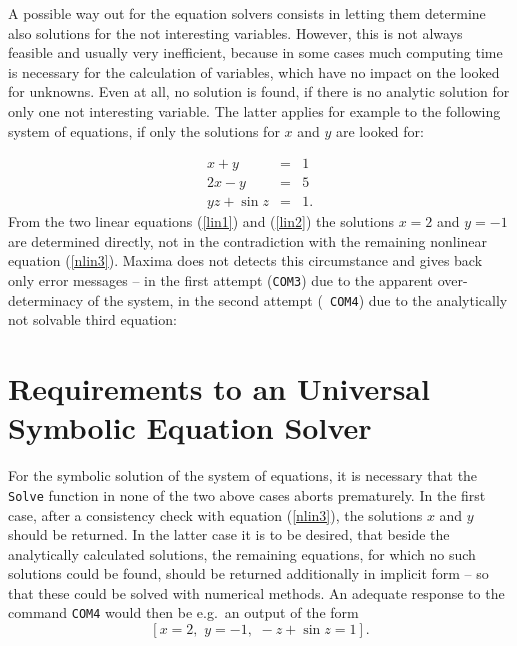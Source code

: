 A possible way out for the equation solvers consists in letting them determine also solutions for the not interesting variables. However, this is not always feasible and usually very inefficient, because in some cases much computing time is necessary for the calculation of variables, which have no impact on the looked for unknowns. Even at all, no solution is found, if there is no analytic solution for only one not interesting variable. The latter applies for example to the following system of equations, if only the solutions for $x$ and $y$ are looked for:

\begin{eqnarray}
x  + y      &=& 1  \label{lin1} \\
2x - y      &=& 5  \label{lin2} \\
yz + \sin z &=& 1. \label{nlin3}
\end{eqnarray}
From the two linear equations (\ref{lin1}) and (\ref{lin2}) the solutions  $x = 2$ and $y = -1$ are determined directly, not in the contradiction with the remaining nonlinear equation (\ref{nlin3}). Maxima does not detects this circumstance and gives back only error messages -- 
 in the first attempt ({\tt COM3}) due to  the apparent over-determinacy of the system, in the second attempt ({\tt
COM4}) due to the analytically not solvable third equation:

\section[Requirements to an Symbolic Equation Solver]%
{\label{SolverAnforderungen}Requirements to an Universal Symbolic Equation Solver}

For the symbolic solution of the system of  equations, it is necessary that the  \verb+Solve+ function in none of the two above cases aborts prematurely. In the first case, after a consistency check with equation (\ref{nlin3}), the solutions $x$ and $y$ should be returned. 
In the latter case it is to be desired, that beside the analytically calculated solutions, the remaining equations, for which no such solutions could be found, should be  returned additionally in implicit form -- so that these could be solved with numerical methods. An adequate response to the command \verb+COM4+ would then be e.g.\ an output of the form
\begin{displaymath}
\left[ x = 2, \,\, y = -1, \,\, -z + \sin z = 1 \right].
\end{displaymath}  

